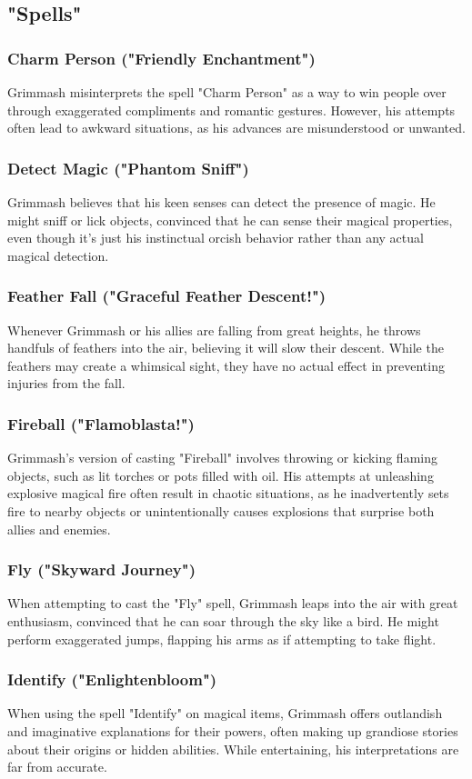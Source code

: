 \documentclass[letterpaper,openany,oneside,twocolumn]{book}
\begin{document}
\subsection*{"Spells"}
\subsubsection*{Charm Person ("Friendly Enchantment")}
Grimmash misinterprets the spell "Charm Person" as a way to win people over through exaggerated compliments and romantic gestures. However, his attempts often lead to awkward situations, as his advances are misunderstood or unwanted.
\subsubsection*{Detect Magic ("Phantom Sniff")}
Grimmash believes that his keen senses can detect the presence of magic. He might sniff or lick objects, convinced that he can sense their magical properties, even though it's just his instinctual orcish behavior rather than any actual magical detection.
\subsubsection*{Feather Fall ("Graceful Feather Descent!")}
Whenever Grimmash or his allies are falling from great heights, he throws handfuls of feathers into the air, believing it will slow their descent. While the feathers may create a whimsical sight, they have no actual effect in preventing injuries from the fall.
\subsubsection*{Fireball ("Flamoblasta!")}
Grimmash's version of casting "Fireball" involves throwing or kicking flaming objects, such as lit torches or pots filled with oil. His attempts at unleashing explosive magical fire often result in chaotic situations, as he inadvertently sets fire to nearby objects or unintentionally causes explosions that surprise both allies and enemies.
\subsubsection*{Fly ("Skyward Journey")}
When attempting to cast the "Fly" spell, Grimmash leaps into the air with great enthusiasm, convinced that he can soar through the sky like a bird. He might perform exaggerated jumps, flapping his arms as if attempting to take flight.
\subsubsection*{Identify ("Enlightenbloom")}
When using the spell "Identify" on magical items, Grimmash offers outlandish and imaginative explanations for their powers, often making up grandiose stories about their origins or hidden abilities. While entertaining, his interpretations are far from accurate.
\end{document}
